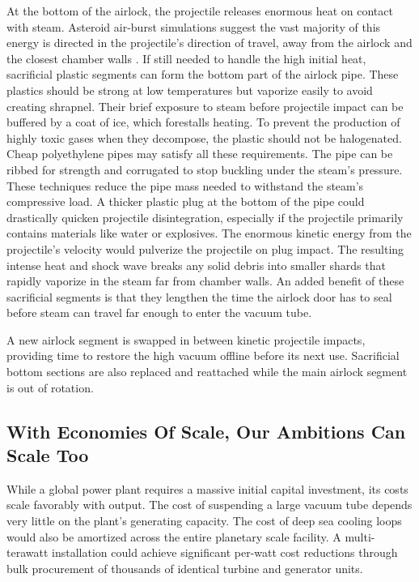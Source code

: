 \documentclass{article}
\begin{document}
At the bottom of the airlock, the projectile releases enormous heat on contact with steam. Asteroid air-burst simulations suggest the vast majority of this energy is directed in the projectile's direction of travel, away from the airlock and the closest chamber walls \cite{tunguska_downwards}. If still needed to handle the high initial heat, sacrificial plastic segments can form the bottom part of the airlock pipe. These plastics should be strong at low temperatures but vaporize easily to avoid creating shrapnel. Their brief exposure to steam before projectile impact can be buffered by a coat of ice, which forestalls heating. To prevent the production of highly toxic gases when they decompose, the plastic should not be halogenated. Cheap polyethylene pipes may satisfy all these requirements.  The pipe can be ribbed for strength and corrugated to stop buckling under the steam's pressure.  These techniques reduce the pipe mass needed to withstand the steam's compressive load.  A thicker plastic plug at the bottom of the pipe could drastically quicken projectile disintegration, especially if the projectile primarily contains materials like water or explosives. The enormous kinetic energy from the projectile's velocity would pulverize the projectile on plug impact. The resulting intense heat and shock wave breaks any solid debris into smaller shards that rapidly vaporize in the steam far from chamber walls.  An added benefit of these sacrificial segments is that they lengthen the time the airlock door has to seal before steam can travel far enough to enter the vacuum tube.

A new airlock segment is swapped in between kinetic projectile impacts, providing time to restore the high vacuum offline before its next use. Sacrificial bottom sections are also replaced and reattached while the main airlock segment is out of rotation.

\subsection{With Economies Of Scale, Our Ambitions Can Scale Too}\label{sec:strawway_economics}

While a global power plant requires a massive initial capital investment, its costs scale favorably with output. The cost of suspending a large vacuum tube depends very little on the plant's generating capacity. The cost of deep sea cooling loops would also be amortized across the entire planetary scale facility.  A multi-terawatt installation could achieve significant per-watt cost reductions through bulk procurement of thousands of identical turbine and generator units. 
\end{document}
